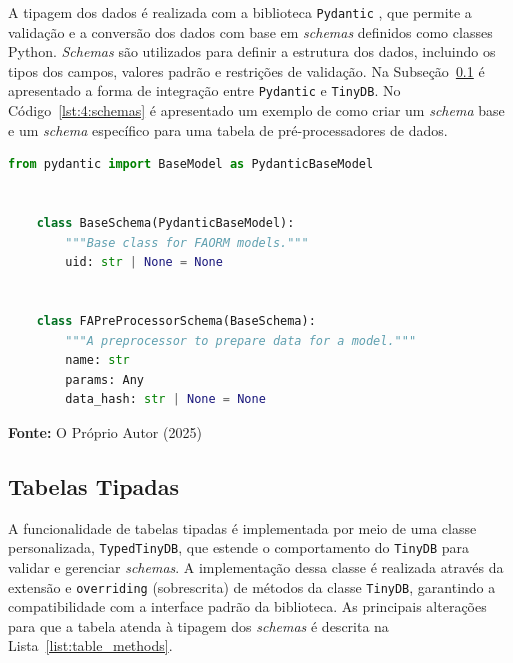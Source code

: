 A tipagem dos dados é realizada com a biblioteca \texttt{Pydantic} \cite{pydantic}, que permite a validação e a conversão dos dados com base em \textit{schemas} definidos como classes Python. \textit{Schemas} são utilizados para definir a estrutura dos dados, incluindo os tipos dos campos, valores padrão e restrições de validação. Na Subseção~\ref{subsec:3.1-typed-tables} é apresentado a forma de integração entre \texttt{Pydantic} e \texttt{TinyDB}. No Código~\ref{lst:4:schemas} é apresentado um exemplo de como criar um \textit{schema} base e um \textit{schema} específico para uma tabela de pré-processadores de dados.

\hfill \break

\begin{center}
    \begin{lstlisting}[language=Python, basicstyle=\tiny, caption={Exemplo de definição de \textit{schemas} com \texttt{Pydantic}.}, label={lst:4:schemas}]
    from pydantic import BaseModel as PydanticBaseModel


    class BaseSchema(PydanticBaseModel):
        """Base class for FAORM models."""
        uid: str | None = None


    class FAPreProcessorSchema(BaseSchema):
        """A preprocessor to prepare data for a model."""
        name: str
        params: Any
        data_hash: str | None = None
    \end{lstlisting}
    \centerline{\textbf{Fonte:} O Próprio Autor (2025)}
\end{center}

\subsection{Tabelas Tipadas}
\label{subsec:3.1-typed-tables}

A funcionalidade de tabelas tipadas é implementada por meio de uma classe personalizada, \texttt{TypedTinyDB}, que estende o comportamento do \texttt{TinyDB} para validar e gerenciar \textit{schemas}. A implementação dessa classe é realizada através da extensão e \texttt{overriding} (sobrescrita) de métodos da classe \texttt{TinyDB}, garantindo a compatibilidade com a interface padrão da biblioteca. As principais alterações para que a tabela atenda à tipagem dos \textit{schemas} é descrita na Lista~\ref{list:table_methods}.

